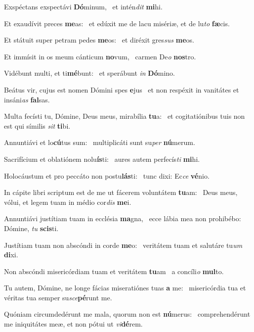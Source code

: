 \item Exspéctans exspectávi \textbf{Dó}minum,~\psstar{} et intén\textit{dit} \textbf{mi}hi.
\item Et exaudívit preces \textbf{me}as:~\psstar{} et edúxit me de lacu misériæ, et de lu\textit{to} \textbf{fæ}cis.
\item Et státuit super petram pedes \textbf{me}os:~\psstar{} et diréxit gres\textit{sus} \textbf{me}os.
\item Et immísit in os meum cánticum \textbf{no}vum,~\psstar{} carmen De\textit{o} \textbf{nos}tro.
\item Vidébunt multi, et ti\textbf{mé}bunt:~\psstar{} et sperábunt \textit{in} \textbf{Dó}mino.
\item Beátus vir, cujus est nomen Dómini spes \textbf{e}jus~\psstar{} et non respéxit in vanitátes et insáni\textit{as} \textbf{fal}sas.
\item Multa fecísti tu, Dómine, Deus meus, mirabília \textbf{tu}a:~\psstar{} et cogitatiónibus tuis non est qui símilis \textit{sit} \textbf{ti}bi.
\item Annuntiávi et lo\textbf{cú}tus sum:~\psstar{} multiplicáti sunt su\textit{per} \textbf{nú}merum.
\item Sacrifícium et oblatiónem nolu\textbf{ís}ti:~\psstar{} aures autem perfecís\textit{ti} \textbf{mi}hi.
\item Holocáustum et pro peccáto non postu\textbf{lás}ti:~\psstar{} tunc dixi: Ec\textit{ce} \textbf{vé}nio.
\item In cápite libri scriptum est de me ut fácerem voluntátem \textbf{tu}am:~\psstar{} Deus meus, vólui, et legem tuam in médio cor\textit{dis} \textbf{me}i.
\item Annuntiávi justítiam tuam in ecclésia \textbf{ma}gna,~\psstar{} ecce lábia mea non prohibébo: Dómine, \textit{tu} \textbf{scis}ti.
\item Justítiam tuam non abscóndi in corde \textbf{me}o:~\psstar{} veritátem tuam et salutáre tu\textit{um} \textbf{di}xi.
\item Non abscóndi misericórdiam tuam et veritátem \textbf{tu}am~\psstar{} a concíli\textit{o} \textbf{mul}to.
\item Tu autem, Dómine, ne longe fácias miseratiónes tuas \textbf{a} me:~\psstar{} misericórdia tua et véritas tua semper su\textit{sce}\textbf{pé}runt me.
\item Quóniam circumdedérunt me mala, quorum non est \textbf{nú}merus:~\psstar{} comprehendérunt me iniquitátes meæ, et non pótui ut \textit{vi}\textbf{dé}rem.
